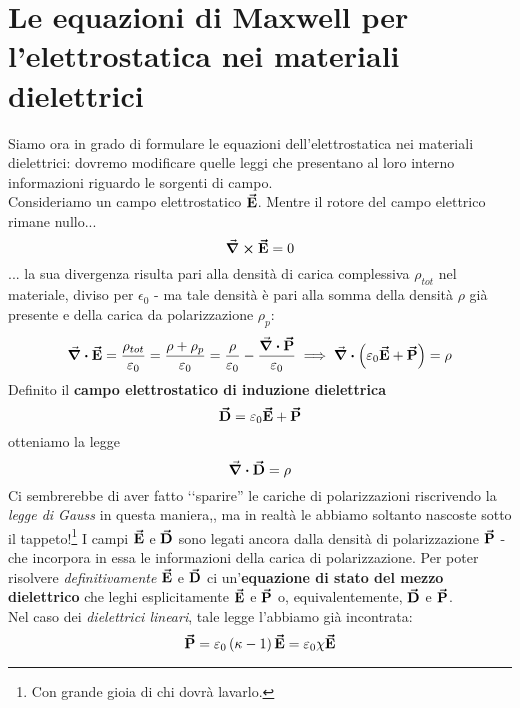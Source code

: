 \section{Le equazioni di Maxwell per l'elettrostatica nei materiali dielettrici}\label{EqMaxwellDielettrici}
Siamo ora in grado di formulare le equazioni dell'elettrostatica nei materiali dielettrici: dovremo modificare quelle leggi che presentano al loro interno informazioni riguardo le sorgenti di campo.\\
Consideriamo un campo elettrostatico $\vb*{\va{E}}$. Mentre il rotore del campo elettrico rimane nullo...
\begin{equation}
	\curl{\vb*{\va{E}}}=0
\end{equation}
... la sua divergenza risulta pari alla densità di carica complessiva $\rho_{tot}$ nel materiale, diviso per $\epsilon_0$ - ma tale densità è pari alla somma della densità $\rho$ già presente e della carica da polarizzazione $\rho_p$:
\begin{equation*}
	\div{\vb*{\va{E}}}=\frac{\rho_{tot}}{\varepsilon_0}=\frac{\rho+\rho_p}{\varepsilon_0}=\frac{\rho}{\varepsilon_0}-\frac{\div{\vb*{\va{P}}}}{\varepsilon_0}\implies \div{\left(\varepsilon_0\vb*{\va{E}}+\vb*{\va{P}}\right)}=\rho
\end{equation*}
Definito il \textbf{campo elettrostatico di induzione dielettrica}
\begin{equation}
	\vb*{\va{D}}=\varepsilon_0\vb*{\va{E}}+\vb*{\va{P}}
\end{equation}
otteniamo la legge
\begin{equation}
	\div{\vb*{\va{D}}}=\rho\label{SecondaMaxwellDIelettriciUno}
\end{equation}
Ci sembrerebbe di aver fatto ‘‘sparire'' le cariche di polarizzazioni riscrivendo la \textit{legge di Gauss} in questa maniera,, ma in realtà le abbiamo soltanto nascoste sotto il tappeto!\footnote{Con grande gioia di chi dovrà lavarlo.} I campi $\vb*{\va{E}}$ e $\vb*{\va{D}}$ sono legati ancora dalla densità di polarizzazione $\vb*{\va{P}}$ - che incorpora in essa le informazioni della carica di polarizzazione. Per poter risolvere \textit{definitivamente} $\vb*{\va{E}}$ e $\vb*{\va{D}}$ ci un'\textbf{equazione di stato del mezzo dielettrico} che leghi esplicitamente $\vb*{\va{E}}$ e $\vb*{\va{P}}$ o, equivalentemente, $\vb*{\va{D}}$ e $\vb*{\va{P}}$.\\
Nel caso dei \textit{dielettrici lineari}, tale legge l'abbiamo già incontrata:
\begin{equation*}
	\vb*{\va{P}}=\varepsilon_0\left(\kappa-1\right)\vb*{\va{E}}=\varepsilon_0\chi\vb*{\va{E}}
\end{equation*}
